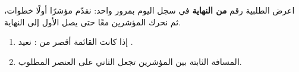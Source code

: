 \begin{statement}
اعرض الطلبية رقم  \textbf{من النهاية} في سجل اليوم بمرور واحد: نقدّم مؤشرًا أولًا  خطوات، ثم نحرك المؤشرين معًا حتى يصل الأول إلى النهاية.
\end{statement}
\begin{stepsbox}\begin{enumerate}
\item إذا كانت القائمة أقصر من : نعيد .
\item المسافة الثابتة  بين المؤشرين تجعل الثاني على العنصر المطلوب.
\end{enumerate}\end{stepsbox}
